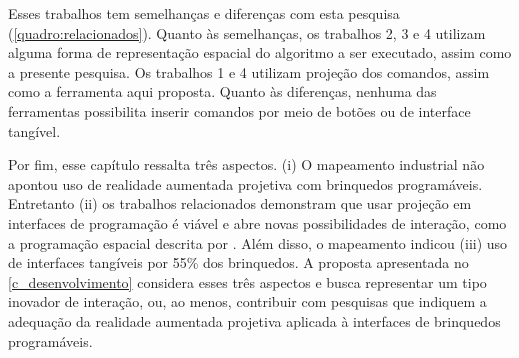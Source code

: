 Esses trabalhos tem semelhanças e diferenças com esta pesquisa (\autoref{quadro:relacionados}). Quanto às semelhanças, os trabalhos 2, 3 e 4 utilizam alguma forma de representação espacial do algoritmo a ser executado, assim como a presente pesquisa. Os trabalhos 1 e 4 utilizam projeção dos comandos, assim como a ferramenta aqui proposta. Quanto às diferenças, nenhuma das ferramentas possibilita inserir comandos por meio de botões ou de interface tangível. 

Por fim, esse capítulo ressalta três aspectos. (i) O mapeamento industrial não apontou uso de realidade aumentada projetiva com brinquedos programáveis. Entretanto (ii) os trabalhos relacionados demonstram que usar projeção em interfaces de programação é viável e abre novas possibilidades de interação, como a programação espacial descrita por . Além disso, o mapeamento indicou (iii) uso de interfaces tangíveis por 55\% dos brinquedos. A proposta apresentada no \autoref{c_desenvolvimento} considera esses três aspectos e busca representar um tipo inovador de interação, ou, ao menos, contribuir com pesquisas que indiquem a adequação da realidade aumentada projetiva aplicada à interfaces de brinquedos programáveis.

